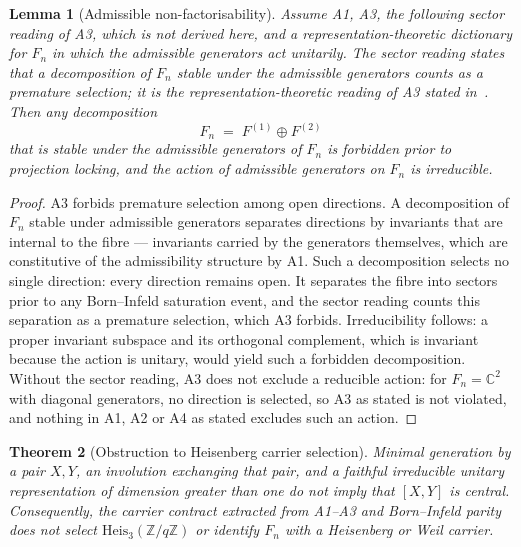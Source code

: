 \documentclass[11pt,a4paper]{article}
\newtheorem{theorem}{Theorem}[section]
\newtheorem{lemma}[theorem]{Lemma}
\begin{document}
    \begin{lemma}[Admissible non-factorisability]
      \label{lem:non-factorisation}
      Assume A1, A3, the following \emph{sector reading} of A3, which is not derived here, and a
      representation-theoretic dictionary for $F_n$ in which the admissible generators act unitarily.
      The sector reading states that a decomposition of $F_n$ stable under the admissible generators
      counts as a premature selection; it is the representation-theoretic reading of A3 stated
      in~\cite{Beau2026HeisenbergStructure}.
      Then any decomposition
      \[
        F_n \;=\; F^{(1)} \oplus F^{(2)}
      \]
      that is stable under the admissible generators of $F_n$ is forbidden prior
      to projection locking, and the action of admissible generators on $F_n$ is irreducible.
    \end{lemma}

    \begin{proof}
      A3 forbids premature selection among open directions.
      A decomposition of $F_n$ stable under admissible generators separates
      directions by invariants that are internal to the fibre — invariants carried
      by the generators themselves, which are constitutive of the admissibility
      structure by A1.
      Such a decomposition selects no single direction: every direction remains open.
      It separates the fibre into sectors prior to any Born--Infeld saturation event, and the
      sector reading counts this separation as a premature selection, which A3 forbids.
      Irreducibility follows: a proper invariant subspace and its orthogonal complement, which is invariant
      because the action is unitary, would yield such a forbidden decomposition.
      Without the sector reading, A3 does not exclude a reducible action: for $F_n=\mathbb{C}^2$ with
      diagonal generators, no direction is selected, so A3 as stated is not violated, and nothing in A1, A2
      or A4 as stated excludes such an action.
    \end{proof}

    \begin{theorem}[Obstruction to Heisenberg carrier selection]
      \label{thm:heisenberg}
      Minimal generation by a pair $X,Y$, an involution exchanging that pair,
      and a faithful irreducible unitary representation of dimension greater
      than one do not imply that $[X,Y]$ is central.
      Consequently, the carrier contract extracted from A1--A3 and
      Born--Infeld parity does not select
      $\mathrm{Heis}_3(\mathbb{Z}/q\mathbb{Z})$ or identify
      $F_n$ with a Heisenberg or Weil carrier.
    \end{theorem}
\end{document}
